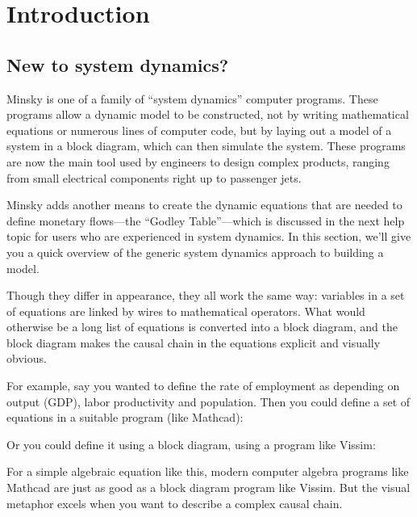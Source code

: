 \chapter{Introduction}
\label{Introduction}

\section{New to system dynamics?}
\label{intro:new}

Minsky is one of a family of ``system dynamics'' computer
programs. These programs allow a dynamic model to be constructed, not
by writing mathematical equations or numerous lines of computer code,
but by laying out a model of a system in a block diagram, which can then
simulate the system. These programs are now the main tool used by
engineers to design complex products, ranging from small electrical
components right up to passenger jets.


Minsky adds another means to create the dynamic equations that are
needed to define monetary flows---the ``Godley Table''---which is
discussed in the next help topic for users who are experienced in
system dynamics. In this section, we'll give you a quick overview of
the generic system dynamics approach to building a model.


Though they differ in appearance, they all work the same way:
variables in a set of equations are linked by wires to mathematical
operators. What would otherwise be a long list of equations is
converted into a block diagram, and the block diagram makes the causal chain
in the equations explicit and visually obvious.

For example, say you wanted to define the rate of employment as
depending on output (GDP), labor productivity and population. Then you
could define a set of equations in a suitable program (like Mathcad):

\begin{center}
\end{center}

Or you could define it using a block diagram, using a program like Vissim:

\begin{center}
\end{center}

For a simple algebraic equation like this, modern computer algebra
programs like Mathcad are just as good as a block diagram program like
Vissim. But the visual metaphor excels when you want to describe a
complex causal chain.


